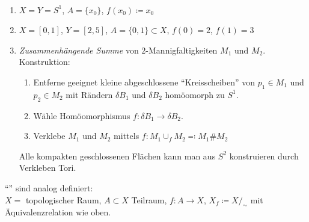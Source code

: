 \begin{example} \
  \begin{enumerate}
    \item $ X = Y = S^1 $, $ A = \{ x_0 \} $, $ f(x_0) \coloneqq x_0 $
    \item $ X = [0,1] $, $ Y = [2,5] $, $ A = \{ 0,1 \} \subset X $, $ f(0) = 2 $, $ f(1) = 3 $
    \item \emph{Zusammenhängende Summe} von $ 2 $-Mannigfaltigkeiten $ M_1 $ und $ M_2 $.
      \\
      Konstruktion:
      \begin{enumerate}
        \item Entferne geeignet kleine abgeschlossene ``Kreisscheiben'' von $ p_1 \in M_1 $ und $ p_2 \in M_2 $ mit Rändern $ \delta B_1 $ und $ \delta B_2 $ homöomorph zu $ S^1 $.
        \item Wähle Homöomorphismus $ f: \delta B_1 \to \delta B_2 $.
        \item Verklebe $ M_1 $ und $ M_2 $ mittels $ f : M_1 \cup_f M_2 \eqqcolon M_1 \# M_2 $
      \end{enumerate}
      Alle kompakten geschlossenen Flächen kann man aus $ S^2 $ konstruieren durch Verkleben Tori.
  \end{enumerate}
\end{example}

\begin{remark}[Selbstverklebungen]
  ``''\label{def:selbstverklebung} sind analog definiert: \\
  $ X = $ topologischer Raum, $ A \subset X $ Teilraum, $ f : A \to X $, $ X_f \coloneqq X/_\sim $ mit Äquivalenzrelation wie oben.
\end{remark}


